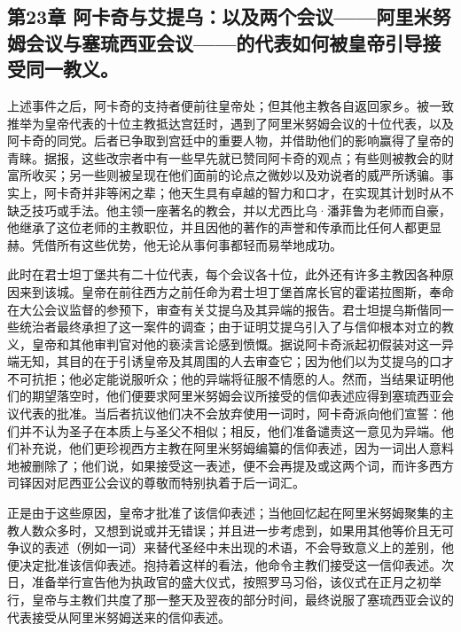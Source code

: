 
\subsection{第23章 阿卡奇与艾提乌：以及两个会议——阿里米努姆会议与塞琉西亚会议——的代表如何被皇帝引导接受同一教义。}

上述事件之后，阿卡奇的支持者便前往皇帝处；但其他主教各自返回家乡。被一致推举为皇帝代表的十位主教抵达宫廷时，遇到了阿里米努姆会议的十位代表，以及阿卡奇的同党。后者已争取到宫廷中的重要人物，并借助他们的影响赢得了皇帝的青睐。据报，这些改宗者中有一些早先就已赞同阿卡奇的观点；有些则被教会的财富所收买；另一些则被呈现在他们面前的论点之微妙以及劝说者的威严所诱骗。事实上，阿卡奇并非等闲之辈；他天生具有卓越的智力和口才，在实现其计划时从不缺乏技巧或手法。他主领一座著名的教会，并以尤西比乌·潘菲鲁为老师而自豪，他继承了这位老师的主教职位，并且因他的著作的声誉和传承而比任何人都更显赫。凭借所有这些优势，他无论从事何事都轻而易举地成功。\par

此时在君士坦丁堡共有二十位代表，每个会议各十位，此外还有许多主教因各种原因来到该城。皇帝在前往西方之前任命为君士坦丁堡首席长官的霍诺拉图斯，奉命在大公会议监督的参预下，审查有关艾提乌及其异端的报告。君士坦提乌斯偕同一些统治者最终承担了这一案件的调查；由于证明艾提乌引入了与信仰根本对立的教义，皇帝和其他审判官对他的亵渎言论感到愤慨。据说阿卡奇派起初假装对这一异端无知，其目的在于引诱皇帝及其周围的人去审查它；因为他们以为艾提乌的口才不可抗拒；他必定能说服听众；他的异端将征服不情愿的人。然而，当结果证明他们的期望落空时，他们便要求阿里米努姆会议所接受的信仰表述应得到塞琉西亚会议代表的批准。当后者抗议他们决不会放弃使用一词时，阿卡奇派向他们宣誓：他们并不认为圣子在本质上与圣父不相似；相反，他们准备谴责这一意见为异端。他们补充说，他们更珍视西方主教在阿里米努姆编纂的信仰表述，因为一词出人意料地被删除了；他们说，如果接受这一表述，便不会再提及或这两个词，而许多西方司铎因对尼西亚公会议的尊敬而特别执着于后一词汇。\par

正是由于这些原因，皇帝才批准了该信仰表述；当他回忆起在阿里米努姆聚集的主教人数众多时，又想到说或并无错误；并且进一步考虑到，如果用其他等价且无可争议的表述（例如一词）来替代圣经中未出现的术语，不会导致意义上的差别，他便决定批准该信仰表述。抱持着这样的看法，他命令主教们接受这一信仰表述。次日，准备举行宣告他为执政官的盛大仪式，按照罗马习俗，该仪式在正月之初举行，皇帝与主教们共度了那一整天及翌夜的部分时间，最终说服了塞琉西亚会议的代表接受从阿里米努姆送来的信仰表述。\par

